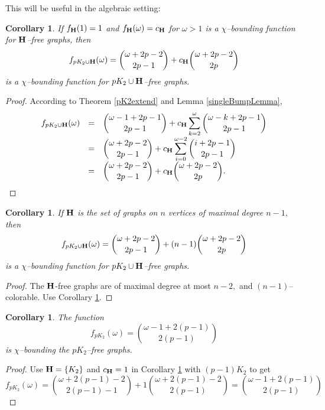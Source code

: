 \documentclass{article}
\theoremstyle{plain}
\newtheorem{cor}[thm]{Corollary}
\theoremstyle{definition}
\begin{document}
This will be useful in the algebraic setting:

\begin{cor}\label{corConstF}
 If $f_{{\bf H  } }(1) = 1$ and   $f_{{\bf H  } }(\omega) = c_{\bf H  }$ for $\omega > 1$ is a $\chi$--bounding function for ${\bf H  }$--free graphs, then
\[ f_{pK_2 \cup {\bf H  } }(\omega) =  {\omega + 2p-2  \choose 2p-1}  +   c_{\bf H  }  {\omega + 2p-2  \choose 2p} \]
is a $\chi$--bounding function for ${ pK_2 \cup \bf H  }$--free graphs.
\end{cor}
\begin{proof}
According to Theorem \ref{pK2extend} and Lemma \ref{singleBumpLemma},
\[ \begin{array}{rcl}
f_{pK_2 \cup {\bf H  } }(\omega) & = & \displaystyle  {\omega-1 + 2p-1  \choose 2p-1}  +   c_{\bf H  }   \sum_{k=2}^{\omega}   {\omega-k+ 2p-1  \choose 2p-1}  \\
& = & \displaystyle  {\omega+ 2p-2  \choose 2p-1}  +   c_{\bf H  }   \sum_{i=0}^{\omega-2}   {i + 2p-1  \choose 2p-1}  \\
& = & \displaystyle  {\omega + 2p-2  \choose 2p-1}  +   c_{\bf H  }  {\omega + 2p-2  \choose 2p}.     \\
\end{array}
\]
\end{proof}

\begin{cor}\label{corBoundingSimple}
If ${\bf H}$ is the set of graphs on $n$ vertices of maximal degree $n-1,$ then 
\[ f_{pK_2 \cup {\bf H  } }(\omega) =  {\omega + 2p-2  \choose 2p-1}  +   (n-1)  {\omega + 2p-2  \choose 2p} \]
is a $\chi$--bounding function for ${ pK_2 \cup \bf H  }$--free graphs.
\end{cor}
\begin{proof}
The ${\bf H}$-free graphs are of maximal degree at most $n-2,$ and $(n-1)$--colorable. Use Corollary \ref{corConstF}.
\end{proof}

\begin{cor}\label{corInducedMatching} The function
\[
f_{pK_2}(\omega) =  {\omega-1 + 2(p-1)  \choose 2(p-1)}
\]
is $\chi$--bounding the $pK_2$--free graphs.
\end{cor}
\begin{proof} Use ${\bf H}=\{K_2\}$ and $ c_{\bf H  }=1$ in Corollary \ref{corConstF} with $(p-1)K_2$ to get
\[ f_{pK_2}(\omega) = {\omega + 2(p-1)-2  \choose 2(p-1)-1}  +   1  {\omega + 2(p-1)-2  \choose 2(p-1)} = {\omega-1 + 2(p-1)  \choose 2(p-1)}
\]
\end{proof}
\end{document}
